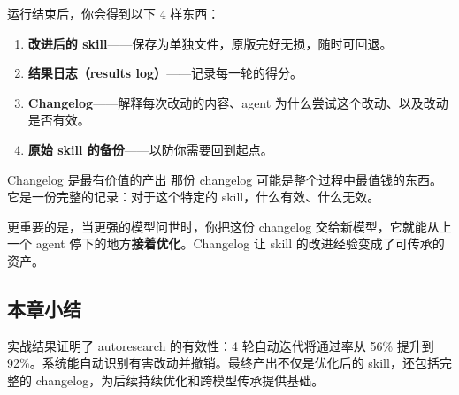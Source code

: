 运行结束后，你会得到以下 4 样东西：

\begin{enumerate}
    \item \textbf{改进后的 skill}——保存为单独文件，原版完好无损，随时可回退。
    \item \textbf{结果日志（results log）}——记录每一轮的得分。
    \item \textbf{Changelog}——解释每次改动的内容、agent 为什么尝试这个改动、以及改动是否有效。
    \item \textbf{原始 skill 的备份}——以防你需要回到起点。
\end{enumerate}

\begin{importantbox}{Changelog 是最有价值的产出}
那份 changelog 可能是整个过程中最值钱的东西。它是一份完整的记录：对于这个特定的 skill，什么有效、什么无效。

更重要的是，当更强的模型问世时，你把这份 changelog 交给新模型，它就能从上一个 agent 停下的地方\textbf{接着优化}。Changelog 让 skill 的改进经验变成了可传承的资产。
\end{importantbox}

\subsection{本章小结}

实战结果证明了 autoresearch 的有效性：4 轮自动迭代将通过率从 56\% 提升到 92\%。系统能自动识别有害改动并撤销。最终产出不仅是优化后的 skill，还包括完整的 changelog，为后续持续优化和跨模型传承提供基础。

